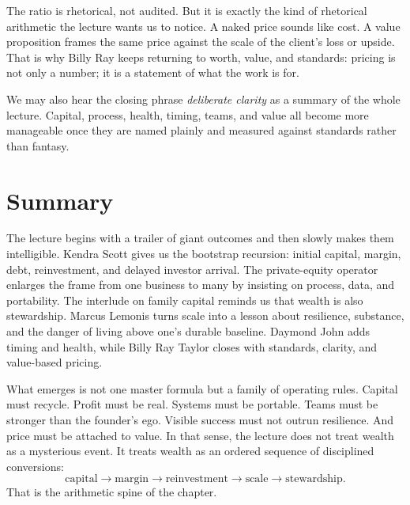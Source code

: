 The ratio is rhetorical, not audited. But it is exactly the kind of rhetorical arithmetic the lecture wants us to notice. A naked price sounds like cost. A value proposition frames the same price against the scale of the client's loss or upside. That is why Billy Ray keeps returning to worth, value, and standards: pricing is not only a number; it is a statement of what the work is for.

We may also hear the closing phrase \emph{deliberate clarity} as a summary of the whole lecture. Capital, process, health, timing, teams, and value all become more manageable once they are named plainly and measured against standards rather than fantasy.

\section{Summary}

The lecture begins with a trailer of giant outcomes and then slowly makes them intelligible. Kendra Scott gives us the bootstrap recursion: initial capital, margin, debt, reinvestment, and delayed investor arrival. The private-equity operator enlarges the frame from one business to many by insisting on process, data, and portability. The interlude on family capital reminds us that wealth is also stewardship. Marcus Lemonis turns scale into a lesson about resilience, substance, and the danger of living above one's durable baseline. Daymond John adds timing and health, while Billy Ray Taylor closes with standards, clarity, and value-based pricing.

What emerges is not one master formula but a family of operating rules. Capital must recycle. Profit must be real. Systems must be portable. Teams must be stronger than the founder's ego. Visible success must not outrun resilience. And price must be attached to value. In that sense, the lecture does not treat wealth as a mysterious event. It treats wealth as an ordered sequence of disciplined conversions:
\[
\text{capital} \to \text{margin} \to \text{reinvestment} \to \text{scale} \to \text{stewardship}.
\]
That is the arithmetic spine of the chapter.